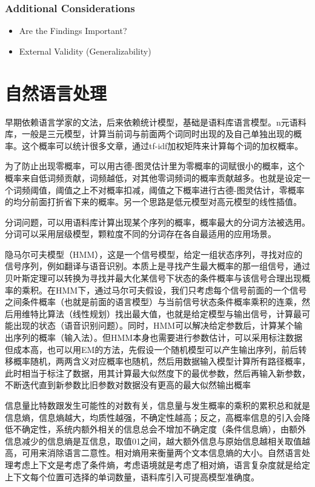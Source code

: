 \documentclass[]{book}
\providecommand{\tightlist}{%
  \setlength{\itemsep}{0pt}\setlength{\parskip}{0pt}}
\begin{document}
\hypertarget{additional-considerations}{%
\subsection{Additional Considerations}\label{additional-considerations}}

\begin{itemize}
\tightlist
\item
  Are the Findings Important?
\item
  External Validity (Generalizability)
\end{itemize}

\hypertarget{nlp}{%
\chapter{自然语言处理}\label{nlp}}

早期依赖语言学家的文法，后来依赖统计模型，基础是语料库语言模型。n元语料库，一般是三元模型，计算当前词与前面两个词同时出现的及自己单独出现的概率。这个概率可以统计很多文章，通过tf-idf加权矩阵来计算每个词的加权概率。

为了防止出现零概率，可以用古德-图灵估计里为零概率的词赋很小的概率，这个概率来自低词频贡献，词频越低，对其他零词频词的概率贡献越多。也就是设定一个词频阈值，阈值之上不对概率扣减，阈值之下概率进行古德-图灵估计，零概率的均分前面打折省下来的概率。另一个思路是低元模型对高元模型的线性插值。

分词问题，可以用语料库计算出现某个序列的概率，概率最大的分词方法被选用。分词可以采用层级模型，颗粒度不同的分词存在各自最适用的应用场景。

隐马尔可夫模型（HMM），这是一个信号模型，给定一组状态序列，寻找对应的信号序列，例如翻译与语音识别。本质上是寻找产生最大概率的那一组信号，通过贝叶斯定理可以转换为寻找并最大化某信号下状态的条件概率与该信号合理出现概率的乘积。在HMM下，通过马尔可夫假设，我们只考虑每个信号前面的一个信号之间条件概率（也就是前面的语言模型）与当前信号状态条件概率乘积的连乘，然后用维特比算法（线性规划）找出最大值，也就是给定模型与输出信号，计算最可能出现的状态（语音识别问题）。同时，HMM可以解决给定参数后，计算某个输出序列的概率（输入法）。但HMM本身也需要进行参数估计，可以采用标注数据但成本高，也可以用EM的方法，先假设一个随机模型可以产生输出序列，前后转移概率随机，两两含义对应概率也随机，然后用数据输入模型计算所有路径概率，此时相当于标注了数据，用其计算最大似然度下的最优参数，然后再输入新参数，不断迭代直到新参数比旧参数对数据没有更高的最大似然输出概率

信息量比特数跟发生可能性的对数有关，信息量与发生概率的乘积的累积总和就是信息熵，信息熵越大，均质性越强，不确定性越高；反之，高概率信息的引入会降低不确定性，系统内额外相关的信息总会不增加不确定度（条件信息熵），由额外信息减少的信息熵是互信息，取值01之间，越大额外信息与原始信息越相关取值越高，可用来消除语言二意性。相对熵用来衡量两个文本信息熵的大小。自然语言处理考虑上下文是考虑了条件熵，考虑语境就是考虑了相对熵，语言复杂度就是给定上下文每个位置可选择的单词数量，语料库引入可提高模型准确度。
\end{document}
